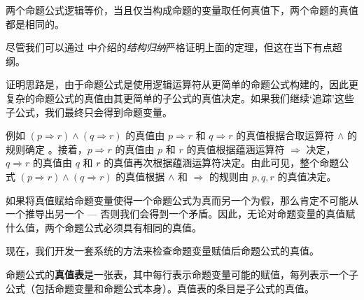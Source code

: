 \begin{theorem}
\label{thmLogicalEquivalentIffSameTruthValues}
两个命题公式逻辑等价，当且仅当构成命题的变量取任何真值下，两个命题的真值都是相同的。
\end{theorem}

\begin{cidea}
尽管我们可以通过  中介绍的\textit{结构归纳}严格证明上面的定理，但这在当下有点超纲。

证明思路是，由于命题公式是使用逻辑运算符从更简单的命题公式构建的，因此更复杂的命题公式的真值由其更简单的子公式的真值决定。如果我们继续`追踪'这些子公式，我们最终只会得到命题变量。

例如 $(p \Rightarrow r) \wedge (q \Rightarrow r)$ 的真值由 $p \Rightarrow r$ 和 $q \Rightarrow r$ 的真值根据合取运算符 $\wedge$ 的规则确定 。接着，$p \Rightarrow r$ 的真值由 $p$ 和 $r$ 的真值根据蕴涵运算符 $\Rightarrow$ 决定，$q \Rightarrow r$ 的真值由 $q$ 和 $r$ 的真值再次根据蕴涵运算符决定。由此可见，整个命题公式 $(p \Rightarrow r) \wedge (q \Rightarrow r)$ 的真值根据 $\wedge$ 和 $\Rightarrow$ 的规则由 $p,q,r$ 的真值决定。

如果将真值赋给命题变量使得一个命题公式为真而另一个为假，那么肯定不可能从一个推导出另一个 --- 否则我们会得到一个矛盾。因此，无论对命题变量的真值赋什么值，两个命题公式必须具有相同的真值。
\end{cidea}

现在，我们开发一套系统的方法来检查命题变量赋值后命题公式的真值。

\begin{definition}
\label{defTruthTable}
命题公式的\textbf{真值表}是一张表，其中每行表示命题变量可能的赋值，每列表示一个子公式（包括命题变量和命题公式本身）。真值表的条目是子公式的真值。
\end{definition}

